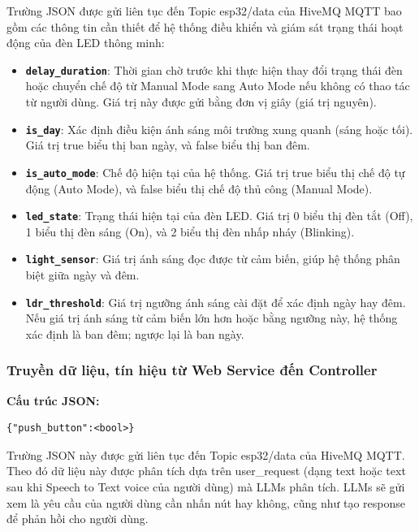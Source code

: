 {Trường JSON được gửi liên tục đến Topic esp32/data của HiveMQ MQTT bao gồm các thông tin cần thiết để hệ thống điều khiển và giám sát trạng thái hoạt động của đèn LED thông minh:
\begin{itemize}
    \item \textbf{\texttt{delay\_duration}}: Thời gian chờ trước khi thực hiện thay đổi trạng thái đèn hoặc chuyển chế độ từ Manual Mode sang Auto Mode nếu không có thao tác từ người dùng. Giá trị này được gửi bằng đơn vị giây (giá trị nguyên).
    \item \textbf{\texttt{is\_day}}: Xác định điều kiện ánh sáng môi trường xung quanh (sáng hoặc tối). Giá trị true biểu thị ban ngày, và false biểu thị ban đêm.
    \item \textbf{\texttt{is\_auto\_mode}}: Chế độ hiện tại của hệ thống. Giá trị true biểu thị chế độ tự động (Auto Mode), và false biểu thị chế độ thủ công (Manual Mode).
    \item \textbf{\texttt{led\_state}}: Trạng thái hiện tại của đèn LED. Giá trị 0 biểu thị đèn tắt (Off), 1 biểu thị đèn sáng (On), và 2 biểu thị đèn nhấp nháy (Blinking).
    \item \textbf{\texttt{light\_sensor}}: Giá trị ánh sáng đọc được từ cảm biến, giúp hệ thống phân biệt giữa ngày và đêm.
    \item \textbf{\texttt{ldr\_threshold}}: Giá trị ngưỡng ánh sáng cài đặt để xác định ngày hay đêm. Nếu giá trị ánh sáng từ cảm biến lớn hơn hoặc bằng ngưỡng này, hệ thống xác định là ban đêm; ngược lại là ban ngày.
\end{itemize}



\pagebreak
\subsubsection{Truyền dữ liệu, tín hiệu từ Web Service đến Controller}\label{subsec:data_Web_to_UNO}

\textbf{Cấu trúc JSON:}
    \begin{lstlisting}
{"push_button":<bool>}\end{lstlisting}

Trường JSON này được gửi liên tục đến Topic esp32/data của HiveMQ MQTT. Theo đó dữ liệu này được phân tích dựa trên user\_request (dạng text hoặc text sau khi Speech to Text voice của người dùng) mà LLMs phân tích. LLMs sẽ gửi xem là yêu cầu của người dùng cần nhấn nút hay không, cũng như tạo response để phản hồi cho người dùng. 

}
